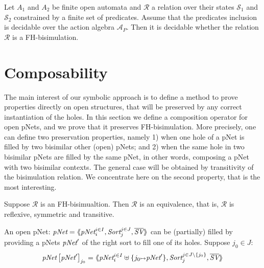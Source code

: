 \documentclass{lncs/llncs}
\begin{document}
\begin{theorem}
Let $A_1$ and $A_2$ be finite open automata
and $\mathcal{R}$ a relation over their states $\mathcal{S}_1$ and
$\mathcal{S}_2$ constrained by a finite set of predicates. Assume that
the predicates inclusion is decidable over  
the action algebra $\mathcal{A}_P$. Then it is decidable whether the relation 
$\mathcal{R}$ is a FH-bisimulation.
  
\end{theorem}




\section{Composability}

The main interest of our symbolic approach is to define a method to
prove properties directly on open structures, that will be preserved
by any correct instantiation of the holes. In this section we define a
composition operator for open pNets, and we prove that it preserves
FH-bisimulation. More precisely, one can define two preservation
properties, namely 1) when one hole of a pNet is filled by two bisimilar
other (open) pNets; and 2) when the same hole in two bisimilar pNets are
filled by the same pNet, in other words, composing a pNet with two
bisimilar contexts. The general case will be obtained by
transitivity of the bisimulation relation. We concentrate here on the
second property, that is the most interesting.



\begin{theorem}\label{thm-equiv} Suppose $\mathcal{R}$ 
is an FH-bisimualtion. Then $\mathcal{R}$ is an equivalence, that is, $\mathcal{R}$ is 
reflexive, symmetric and transitive.

\end{theorem}



\begin{definition}
	An open pNet: $\pNet = \mylangle \pNet_i^{i\in I}, \Sort_j^{j\in J}, 
	\overline{\symb{SV}}\myrangle$
 can be (partially) filled by providing  a pNets $\pNet'$ of the
	right sort to fill one of  its holes.	
	Suppose $j_0\in J$:
	\[\pNet\left[\pNet'\right]_{j_0}= \mylangle 
	\pNet_i^{i\in I}\uplus\{j_0\mapsto \pNet'\},\Sort_j^{j\in J\setminus \{j_0\}},
	\overline{\symb{SV}}\myrangle
	\]
\end{definition}
\end{document}
